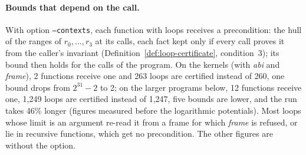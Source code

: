 \documentclass[oneside,english]{amsart}
\numberwithin{equation}{section}
\theoremstyle{plain}
\theoremstyle{definition}
\theoremstyle{plain}
\theoremstyle{plain}
\theoremstyle{remark}
\begin{document}
\paragraph{Bounds that depend on the call.} With option \texttt{--contexts}, each function with loops receives a precondition: the hull of the ranges of $r_0, \dots, r_3$ at its calls, each fact kept only if every call proves it from the caller's invariant (Definition~\ref{def:loop-certificate}, condition~3); its bound then holds for the calls of the program. On the kernels (with \emph{abi} and \emph{frame}), 2 functions receive one and 263 loops are certified instead of 260, one bound drops from $2^{31} - 2$ to 2; on the larger programs below, 12 functions receive one, 1{,}249 loops are certified instead of 1{,}247, five bounds are lower, and the run takes 46\% longer (figures measured before the logarithmic potentials). Most loops whose limit is an argument re-read it from a frame for which \emph{frame} is refused, or lie in recursive functions, which get no precondition. The other figures are without the option.
\end{document}
